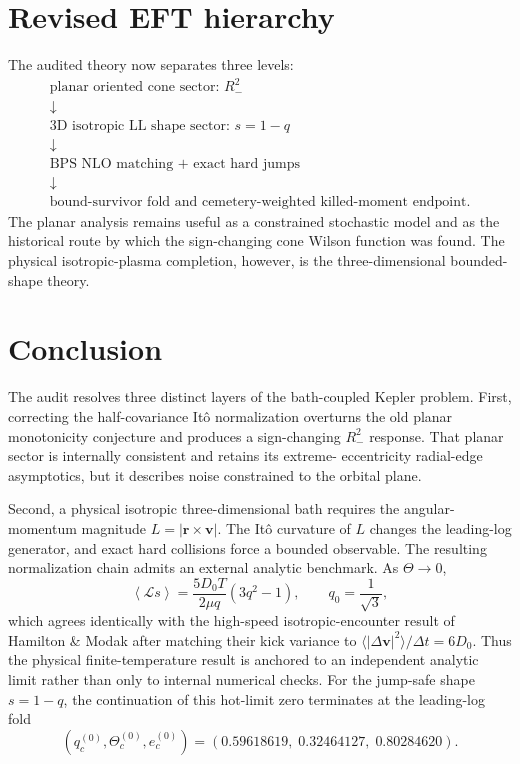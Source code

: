 \documentclass[11pt]{article}
\theoremstyle{remark}
\newcommand{\1}{\mathbf 1}
\begin{document}
\section{Revised EFT hierarchy}

The audited theory now separates three levels:
\[
\boxed{
\begin{array}{c}
\text{planar oriented cone sector: }R_-^2\\
\downarrow\\
\text{3D isotropic LL shape sector: }s=1-q\\
\downarrow\\
\text{BPS NLO matching + exact hard jumps}\\
\downarrow\\
\text{bound-survivor fold and cemetery-weighted killed-moment endpoint}.
\end{array}
}
\]
The planar analysis remains useful as a constrained stochastic model and as
the historical route by which the sign-changing cone Wilson function was
found.  The physical isotropic-plasma completion, however, is the
three-dimensional bounded-shape theory.


\section{Conclusion}

The audit resolves three distinct layers of the bath-coupled Kepler problem.
First, correcting the half-covariance It\^o normalization overturns the old
planar monotonicity conjecture and produces a sign-changing $R_-^2$ response.
That planar sector is internally consistent and retains its extreme-
eccentricity radial-edge asymptotics, but it describes noise constrained to
the orbital plane.

Second, a physical isotropic three-dimensional bath requires the angular-
momentum magnitude $L=|\bm r\times\bm v|$.  The It\^o curvature of $L$
changes the leading-log generator, and exact hard collisions force a bounded
observable.  The resulting normalization chain admits an external analytic
benchmark.  As $\Theta\to0$,
\[
\boxed{
\left\langle\mathcal Ls\right\rangle
=
\frac{5D_0T}{2\mu q}(3q^2-1),
\qquad
q_0=\frac1{\sqrt3},
}
\]
which agrees identically with the high-speed isotropic-encounter result of
Hamilton \& Modak after matching their kick variance to
$\langle|\Delta\bm v|^2\rangle/\Delta t=6D_0$.  Thus the physical
finite-temperature result is anchored to an independent analytic limit rather
than only to internal numerical checks.  For the jump-safe shape $s=1-q$,
the continuation of this hot-limit zero terminates at the leading-log fold
\[
\boxed{
(q_c^{(0)},\Theta_c^{(0)},e_c^{(0)})
=
(0.59618619,\;0.32464127,\;0.80284620).
}
\]
\end{document}
